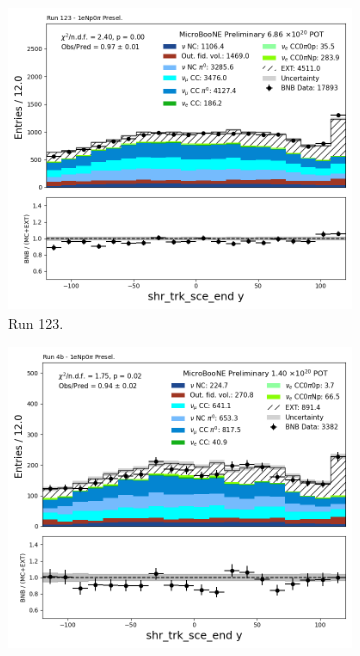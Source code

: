 \begin{figure}[H]
    \centering
    \begin{subfigure}[t]{0.32\linewidth}
        \includegraphics[width=\linewidth]{technote/Appendix_Preselection/Figures/1eNp0pi/Run123/shr_trk_sce_end_y_Run123_1eNp0pi_Presel.png}
        \caption{Run 123.}
    \end{subfigure}%
    \hspace{0.2cm}%
    \begin{subfigure}[t]{0.32\linewidth}
        \includegraphics[width=\linewidth]{technote/Appendix_Preselection/Figures/1eNp0pi/Run4b/shr_trk_sce_end_y_Run4b_1eNp0pi_Presel.png}

\end{subfigure}
\end{figure}
